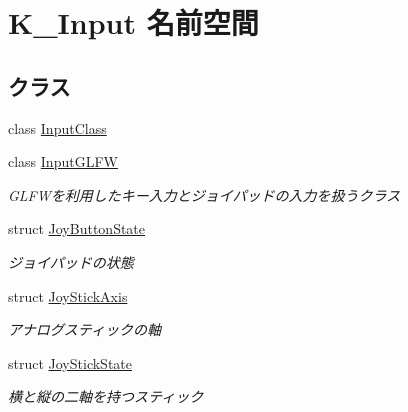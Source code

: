 \hypertarget{namespace_k___input}{}\section{K\+\_\+\+Input 名前空間}
\label{namespace_k___input}
\subsection*{クラス}
\begin{DoxyCompactItemize}
\item 
class \mbox{\hyperlink{class_k___input_1_1_input_class}{Input\+Class}}
\item 
class \mbox{\hyperlink{class_k___input_1_1_input_g_l_f_w}{Input\+G\+L\+FW}}
\begin{DoxyCompactList}\small\item\em G\+L\+F\+Wを利用したキー入力とジョイパッドの入力を扱うクラス \end{DoxyCompactList}\item 
struct \mbox{\hyperlink{struct_k___input_1_1_joy_button_state}{Joy\+Button\+State}}
\begin{DoxyCompactList}\small\item\em ジョイパッドの状態 \end{DoxyCompactList}\item 
struct \mbox{\hyperlink{struct_k___input_1_1_joy_stick_axis}{Joy\+Stick\+Axis}}
\begin{DoxyCompactList}\small\item\em アナログスティックの軸 \end{DoxyCompactList}\item 
struct \mbox{\hyperlink{struct_k___input_1_1_joy_stick_state}{Joy\+Stick\+State}}
\begin{DoxyCompactList}\small\item\em 横と縦の二軸を持つスティック \end{DoxyCompactList}\end{DoxyCompactItemize}
